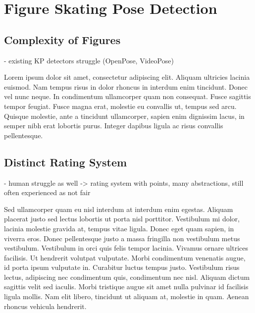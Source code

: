 

\chapter{Figure Skating Pose Detection} %

\label{Figure Skating} %



\section{Complexity of Figures}

- existing KP detectors struggle (OpenPose, VideoPose)

Lorem ipsum dolor sit amet, consectetur adipiscing elit. Aliquam ultricies lacinia euismod. Nam tempus risus in dolor
rhoncus in interdum enim tincidunt. Donec vel nunc neque. In condimentum ullamcorper quam non consequat. Fusce
sagittis tempor feugiat. Fusce magna erat, molestie eu convallis ut, tempus sed arcu. Quisque molestie, ante a
tincidunt ullamcorper, sapien enim dignissim lacus, in semper nibh erat lobortis purus. Integer dapibus ligula ac
risus convallis pellentesque.



\section{Distinct Rating System}

- human struggle as well -> rating system with points, many abstractions, still often experienced as not fair

Sed ullamcorper quam eu nisl interdum at interdum enim egestas. Aliquam placerat justo sed lectus lobortis ut porta
nisl porttitor. Vestibulum mi dolor, lacinia molestie gravida at, tempus vitae ligula. Donec eget quam sapien, in
viverra eros. Donec pellentesque justo a massa fringilla non vestibulum metus vestibulum. Vestibulum in orci quis
felis tempor lacinia. Vivamus ornare ultrices facilisis. Ut hendrerit volutpat vulputate. Morbi condimentum venenatis
augue, id porta ipsum vulputate in. Curabitur luctus tempus justo. Vestibulum risus lectus, adipiscing nec
condimentum quis, condimentum nec nisl. Aliquam dictum sagittis velit sed iaculis. Morbi tristique augue sit amet
nulla pulvinar id facilisis ligula mollis. Nam elit libero, tincidunt ut aliquam at, molestie in quam. Aenean rhoncus
vehicula hendrerit.

